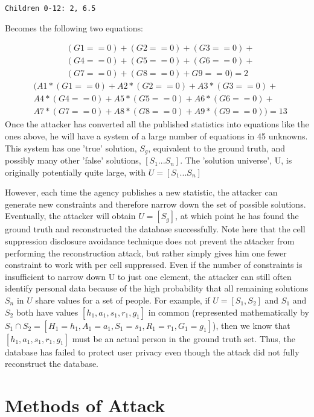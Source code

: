 \documentclass[jou,apacite]{apa6}
\begin{document}
\begin{verbatim}
Children 0-12: 2, 6.5
\end{verbatim}

Becomes the following two equations:

\begin{align*}
& (G1==0) + (G2==0) + (G3==0)+\\
& (G4==0)+  (G5==0) + (G6==0) +\\
& (G7==0) + (G8==0) + G9==0) = 2
\end{align*}
\begin{align*}
& (A1 * (G1==0) + A2 * (G2==0) + A3 * (G3==0) +\\
& A4 * (G4==0) +  A5 * (G5==0) + A6 * (G6==0) + \\
& A7 * (G7==0) + A8 * (G8==0) + A9 * (G9==0)) = 13
\end{align*}
Once the attacker has converted all the published statistics
into equations like the ones above, he will have a system
of a large number of equations in 45 unknowns. This system has one 'true' solution, $S_g$, equivalent to the
ground truth, and possibly many other 'false' solutions, $[S_1...S_n]$.
The 'solution universe', U, is originally potentially  quite large, with $U = [S_1...S_n]$

However, each time the agency publishes a new statistic, the attacker
can generate new constraints and therefore narrow
down the set of possible solutions. Eventually, the attacker
will obtain $U = [S_g]$, at which point he has
found the ground truth and reconstructed the database
successfully. Note here that the cell suppression disclosure avoidance technique does not prevent the attacker from performing the reconstruction attack, but rather simply gives him one fewer constraint to work with per cell suppressed.
Even if the number of constraints is insufficient to narrow down U to just one element, the attacker can still often identify personal data because of the high probability that all remaining solutions $S_n$ in $U$ share values for a set of people. For example, if
$U = [S_1, S_2]$ and $S_1$ and $S_2$ both have values $[h_1, a_1, s_1, r_1, g_1]$ in common
(represented mathematically by $S_1 \cap S_2 = [H_1=h_1, A_1=a_1, S_1=s_1, R_1=r_1, G_1=g_1]$),
then we know that $[h_1, a_1, s_1, r_1, g_1]$ must be an actual person in the ground truth set. Thus, the database has failed to protect user privacy even though the attack did not fully reconstruct the database.

\section{Methods of Attack}
\end{document}
